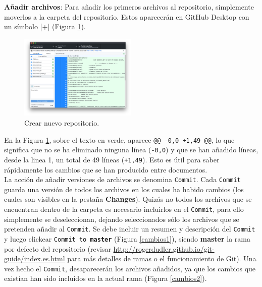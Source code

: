\documentclass[10pt]{article}
\begin{document}
\FloatBarrier

\textbf{Añadir archivos}: Para añadir los primeros archivos al repositorio, simplemente moverlos a la carpeta del repositorio. Estos aparecerán en GitHub Desktop con un símbolo [+] (Figura \ref{archivos}).\\

\begin{figure}[!h]
  \centering
    \includegraphics[width=0.5\textwidth]{Figuras/archivos.png}
  \caption{Crear nuevo repositorio.}
  \label{archivos}
\end{figure}

En la Figura \ref{archivos}, sobre el texto en verde, aparece \texttt{@@ -0,0 +1,49 @@}, lo que significa que no se ha eliminado ninguna línea (\texttt{-0,0}) y que se han añadido líneas, desde la linea 1, un total de 49 líneas (\texttt{+1,49}). Esto es útil para saber rápidamente los cambios que se han producido entre documentos.\\

La acción de añadir versiones de archivos se denomina \texttt{Commit}. Cada \texttt{Commit} guarda una versión de todos los archivos en los cuales ha habido cambios (los cuales son visibles en la pestaña \textbf{Changes}). Quizás no todos los archivos que se encuentran dentro de la carpeta es necesario incluirlos en el \texttt{Commit}, para ello simplemente se deseleccionan, dejando seleccionados sólo los archivos que se pretenden añadir al \texttt{Commit}. Se debe incluir un resumen y descripción del \texttt{Commit} y luego clickear \texttt{Commit to \textbf{master}} (Figura \ref{cambios1}), siendo \textbf{master} la rama por defecto del repositorio (revisar  \url{http://rogerdudler.github.io/git-guide/index.es.html} para más detalles de ramas o el funcionamiento de Git). Una vez hecho el \texttt{Commit}, desaparecerán los archivos añadidos, ya que los cambios que existían han sido incluidos en la actual rama (Figura \ref{cambios2}).\\
\end{document}
